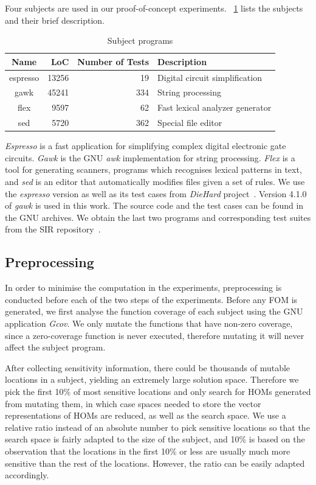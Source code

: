 \documentclass[oribibl]{llncs}
\begin{document}
Four subjects are used in our proof-of-concept experiments. 
\tablename~\ref{tab_subject} lists the subjects and their brief description.

\begin{table}[ht]
\centering
\caption{Subject programs}
\label{tab_subject}
\begin{tabular}{crrl}
\hline
Name & LoC & Number of Tests & Description \\
\hline
espresso & 13256 & 19 & Digital circuit simplification\\
gawk & 45241 & 334 & String processing\\
flex & 9597 & 62 & Fast lexical analyzer generator\\
sed & 5720 & 362 & Special file editor\\
\hline
\end{tabular}%
\end{table}

\emph{Espresso} is a fast application for simplifying complex digital electronic gate circuits.
\emph{Gawk} is the GNU \emph{awk} implementation for string processing.
\emph{Flex} is a tool for generating scanners, programs which recognises lexical patterns in text, and \emph{sed} is an editor that automatically modifies files given a set of rules. 
We use the \emph{espresso} version as well as its test cases from \emph{DieHard} project~\cite{Berger:2006:DPM:1133981.1134000}.
Version 4.1.0 of \emph{gawk} is used in this work.
The source code and the test cases can be found in the GNU archives.
We obtain the last two programs and corresponding test suites from the SIR repository~\cite{SIR2005}. 

\subsection{Preprocessing}
\label{sec_preprocessing}

In order to minimise the computation in the experiments, preprocessing is conducted before each of the two steps of the experiments.
Before any FOM is generated, we first analyse the function coverage of each subject using the GNU application \emph{Gcov}.
We only mutate the functions that have non-zero coverage, since a zero-coverage function is never executed, therefore mutating it will never affect the subject program.

After collecting sensitivity information, there could be thousands of mutable locations in a subject, yielding an extremely large solution space.
Therefore we pick the first 10\% of most sensitive locations and only search for HOMs generated from mutating them, in which case spaces needed to store the vector representations of HOMs are reduced, as well as the search space.
We use a relative ratio instead of an absolute number to pick sensitive locations so that the search space is fairly adapted to the size of the subject, and 10\% is based on the observation that the locations in the first 10\% or less are usually much more sensitive than the rest of the locations.
However, the ratio can be easily adapted accordingly.
\end{document}
